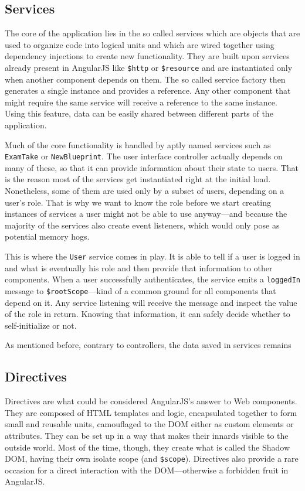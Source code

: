 \documentclass[thesis=M,english,hidelinks]{FITthesis}[2012/10/20]
\newcommand{\code}{\texttt}
\begin{document}
  \subsection{Services}

The core of the application lies in the so called services which are objects that are used to organize code into logical units and which are wired together using dependency injections to create new functionality. They are built upon services already present in AngularJS like \code{\$http} or \code{\$resource}  and are instantiated only when another component depends on them. The so called service factory then generates a single instance and provides a reference. Any other component that might require the same service will receive a reference to the same instance. Using this feature, data can be easily shared between different parts of the application.

Much of the core functionality is handled by aptly named services such as \code{ExamTake} or \code{NewBlueprint}. The user interface controller actually depends on many of these, so that it can provide information about their state to users. That is the reason most of the services get instantiated right at the initial load. Nonetheless, some of them are used only by a subset of users, depending on a user's role. That is why we want to know the role before we start creating instances of services a user might not be able to use anyway---and because the majority of the services also create event listeners, which would only pose as potential memory hogs.

This is where the \code{User} service comes in play. It is able to tell if a user is logged in and what is eventually his role and then provide that information to other components. When a user successfully authenticates, the service emits a \code{loggedIn} message to \code{\$rootScope}---kind of a common ground for all components that depend on it. Any service listening will receive the message and inspect the value of the role in return. Knowing that information, it can safely decide whether to self-initialize or not.

As mentioned before, contrary to controllers, the data saved in services remains

  \subsection{Directives}

Directives are what could be considered AngularJS's answer to Web components. They are composed of HTML templates and logic, encapsulated together to form small and reusable units, camouflaged to the DOM either as custom elements or attributes. They can be set up in a way that makes their innards visible to the outside world. Most of the time, though, they create what is called the Shadow DOM, having their own isolate scope (and \code{\$scope}). Directives also provide a rare occasion for a direct interaction with the DOM---otherwise a forbidden fruit in AngularJS.
\end{document}
